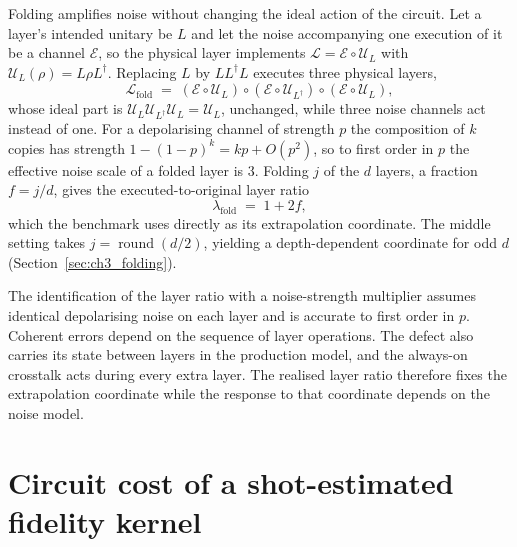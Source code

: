 Folding amplifies noise without changing the ideal action of the circuit. Let a
layer's intended unitary be $L$ and let the noise accompanying one execution of it
be a channel $\mathcal{E}$, so the physical layer implements
$\mathcal{L} = \mathcal{E} \circ \mathcal{U}_L$ with
$\mathcal{U}_L(\rho) = L \rho L^{\dagger}$. Replacing $L$ by $L L^{\dagger} L$
executes three physical layers,
\begin{equation}
    \mathcal{L}_{\text{fold}} \;=\;
    \left( \mathcal{E} \circ \mathcal{U}_{L} \right) \circ
    \left( \mathcal{E} \circ \mathcal{U}_{L^{\dagger}} \right) \circ
    \left( \mathcal{E} \circ \mathcal{U}_{L} \right),
    \label{eq:appA_fold}
\end{equation}
whose ideal part is $\mathcal{U}_L \mathcal{U}_{L^\dagger} \mathcal{U}_L =
\mathcal{U}_L$, unchanged, while three noise channels act instead of one. For a
depolarising channel of strength $p$ the composition of $k$ copies has strength
$1 - (1-p)^{k} = kp + O(p^2)$, so to first order in $p$ the effective noise scale of
a folded layer is $3$. Folding $j$ of the $d$ layers, a fraction $f=j/d$, gives the
executed-to-original layer ratio
\begin{equation}
    \lambda_{\text{fold}} \;=\; 1 + 2f,
    \label{eq:appA_lambda}
\end{equation}
which the benchmark uses directly as its extrapolation coordinate. The middle
setting takes $j=\operatorname{round}(d/2)$, yielding a depth-dependent
coordinate for odd $d$ (Section~\ref{sec:ch3_folding}).

The identification of the layer ratio with a noise-strength multiplier
assumes identical depolarising noise on each layer and is accurate to first
order in $p$. Coherent errors depend on the sequence of layer operations.
The defect also carries its state between layers in the production model, and
the always-on crosstalk acts during every extra layer.
The realised layer ratio therefore fixes the extrapolation coordinate
while the response to that coordinate depends on the noise model.

\section{Circuit cost of a shot-estimated fidelity kernel}
\label{sec:appA_kernelcost}

